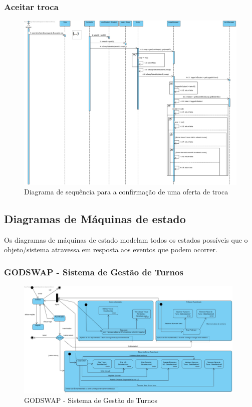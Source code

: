 \documentclass[a4paper]{article}
\begin{document}
\subsubsection{Aceitar troca}

\begin{figure}[H]
\centering
\includegraphics[width=14cm]{SEQAceitarTroca}
\caption{Diagrama de sequência para a confirmação de uma oferta de troca}
\label{}
\end{figure}

\pagebreak
\subsection{Diagramas de Máquinas de estado}
\hspace{3mm}Os diagramas de máquinas de estado modelam todos os estados possíveis que o objeto/sistema atravessa em resposta aos eventos que podem ocorrer.

\subsubsection{GODSWAP - Sistema de Gestão de Turnos}
\begin{figure}[H]
\centering
\includegraphics[width=11cm]{MEGodSwap}
\caption{GODSWAP - Sistema de Gestão de Turnos}
\label{}
\end{figure}
\end{document}
